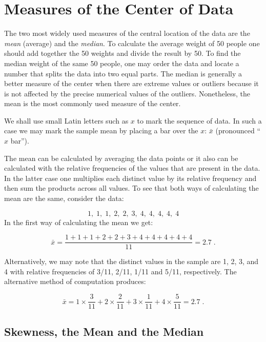 \documentclass[]{krantz}
\theoremstyle{definition}
\theoremstyle{definition}
\theoremstyle{definition}
\theoremstyle{remark}
\begin{document}
\hypertarget{measures-of-the-center-of-data}{%
\section{Measures of the Center of Data}\label{measures-of-the-center-of-data}}

The two most widely used measures of the central location of the data
are the \emph{mean} (average) and the \emph{median}. To calculate the average
weight of 50 people one should add together the 50 weights and divide
the result by 50. To find the median weight of the same 50 people, one
may order the data and locate a number that splits the data into two
equal parts. The median is generally a better measure of the center when
there are extreme values or outliers because it is not affected by the
precise numerical values of the outliers. Nonetheless, the mean is the
most commonly used measure of the center.

We shall use small Latin letters such as \(x\) to mark the sequence of
data. In such a case we may mark the sample mean by placing a bar over
the \(x\): \(\bar x\) (pronounced ``\(x\) bar'').

The mean can be calculated by averaging the data points or it also can
be calculated with the relative frequencies of the values that are
present in the data. In the latter case one multiplies each distinct
value by its relative frequency and then sum the products across all
values. To see that both ways of calculating the mean are the same,
consider the data:

\[1,\; 1,\; 1,\; 2,\; 2,\; 3,\; 4,\; 4,\; 4,\; 4,\; 4\] In the first
way of calculating the mean we get:

\[\bar x = \frac{1 + 1 + 1 + 2 + 2 + 3 + 4 + 4 + 4 + 4 + 4}{11} = 2.7\;.\]

Alternatively, we may note that the distinct values in the sample are 1,
2, 3, and 4 with relative frequencies of 3/11, 2/11, 1/11 and 5/11,
respectively. The alternative method of computation produces:

\[\bar x = 1\times \frac{3}{11} + 2 \times \frac{2}{11} + 3 \times \frac{1}{11} + 4 \times \frac{5}{11} = 2.7\;.\]

\hypertarget{skewness-the-mean-and-the-median}{%
\subsection{Skewness, the Mean and the Median}\label{skewness-the-mean-and-the-median}}
\end{document}
